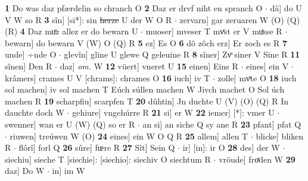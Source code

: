 \documentclass[8pt,a4paper,notitlepage]{article}
\begin{document}
\begin{table}[ht]
\begin{minipage}[t]{0.5\linewidth}
\textbf{1} Do was daz pfærdelin so chranch O \textbf{2} Daz er drvf niht en spranch O  $\cdot$ dâ] do U V W so R \textbf{3} sîn] [si*]: sin \sout{herze} U der W O R  $\cdot$ zervarn] gar zeruaren W (O) (Q) (R) \textbf{4} Daz muͦz allez er do bewarn U  $\cdot$ muoser] mveser T mvͤst er V muͦsse R  $\cdot$ bewarn] do bewarn V (W) O (Q) R \textbf{5} ez] Es O \textbf{6} dô zôch erz] Er zoch es R \textbf{7} unde] ÷nde O  $\cdot$ glevîn] gline U glewe Q geleuine R \textbf{8} sîner] Zvͦ siner V Sine R \textbf{11} sînen] Den R  $\cdot$ daz] \textit{om.} W \textbf{12} vüert] vneret U \textbf{15} einen] Eins R  $\cdot$ eines] ein V  $\cdot$ krâmers] crames U V [chrams]: chrames O \textbf{16} iuch] iv T  $\cdot$ zolle] mvͦte O \textbf{18} iuch sol machen] iv sol machen T Eúch súllen machen W Jivch machet O Sol úch machen R \textbf{19} scharpfiu] scarpfen T \textbf{20} dûhtin] Jn duchte U (V) (O) (Q) R In dauchte doch W  $\cdot$ gehiure] vngehúrre R \textbf{21} si] er W \textbf{22} iemer] [*]: vmer U  $\cdot$ swenner] wan er U (W) (Q) so er R  $\cdot$ an si] an siche Q sy ane R \textbf{23} pfant] pfat Q  $\cdot$ riuwen] treúwen W (O) \textbf{24} eines] ein W O Q R \textbf{25} allem] allen T  $\cdot$ blicke] bliken R  $\cdot$ flôrî] forl Q \textbf{26} sûre] fᵫre R \textbf{27} Sît] Sein Q  $\cdot$ ir] [in]: ir O \textbf{28} des] der W  $\cdot$ siechiu] sieche T [siechie]: [siechio]: siechiv O siechtum R  $\cdot$ vröude] froͤden W \textbf{29} daz] Do W  $\cdot$ in] im W \newline
\end{minipage}
\end{table}
\end{document}

